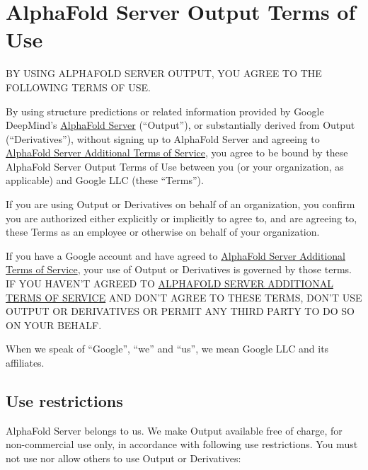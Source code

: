 \documentclass[
]{article}
\author{}
\date{}
\begin{document}
\section{AlphaFold Server Output Terms of
Use}\label{alphafold-server-output-terms-of-use}

BY USING ALPHAFOLD SERVER OUTPUT, YOU AGREE TO THE FOLLOWING TERMS OF
USE.

By using structure predictions or related information provided by Google
DeepMind's \href{https://alphafoldserver.com/}{AlphaFold Server}
(``Output''), or substantially derived from Output (``Derivatives''),
without signing up to AlphaFold Server and agreeing to
\href{https://alphafoldserver.com/terms}{AlphaFold Server Additional
Terms of Service}, you agree to be bound by these AlphaFold Server
Output Terms of Use between you (or your organization, as applicable)
and Google LLC (these ``Terms'').

If you are using Output or Derivatives on behalf of an organization, you
confirm you are authorized either explicitly or implicitly to agree to,
and are agreeing to, these Terms as an employee or otherwise on behalf
of your organization.

If you have a Google account and have agreed to
\href{https://alphafoldserver.com/terms}{AlphaFold Server Additional
Terms of Service}, your use of Output or Derivatives is governed by
those terms. IF YOU HAVEN'T AGREED TO
\href{https://alphafoldserver.com/terms}{ALPHAFOLD SERVER ADDITIONAL
TERMS OF SERVICE} AND DON'T AGREE TO THESE TERMS, DON'T USE OUTPUT OR
DERIVATIVES OR PERMIT ANY THIRD PARTY TO DO SO ON YOUR BEHALF.

When we speak of ``Google'', ``we'' and ``us'', we mean Google LLC and
its affiliates.

\subsection{Use restrictions}\label{use-restrictions}

AlphaFold Server belongs to us. We make Output available free of charge,
for non-commercial use only, in accordance with following use
restrictions. You must not use nor allow others to use Output or
Derivatives:
\end{document}
